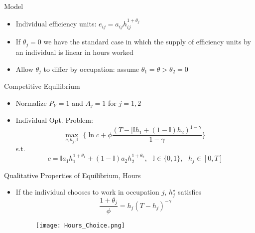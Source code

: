\documentclass[hyperref={bookmarks=false}]{beamer}
\begin{document}
\begin{frame}{Model}
\begin{itemize}
\setlength{\itemsep}{0.35 cm}
\item Individual efficiency units: $e_{ij}=a_{ij}h_{ij}^{1+\theta_{j}}$
\item If $\theta_j=0$ we have the standard case in which the supply of efficiency units by an individual is linear in hours worked
\item Allow $\theta_j$ to differ by occupation: assume $\theta_1=\theta>\theta_2=0$
\end{itemize}
\end{frame}

\begin{frame}{Competitive Equilibrium}
\begin{itemize}
\setlength{\itemsep}{0.35 cm}
\item Normalize $P_Y=1$ and $A_j=1$ for $j=1,2$
\item Individual Opt. Problem:
\begin{equation}
\underset{c,h_j,\mathbb{I}}{\text{max}}\,\,\,\, \Big\{\ln c + \phi \frac{(T-[\mathbb{I}h_1+(1-\mathbb{I})h_2)^{1-\gamma}}{1-\gamma} \Big\}
\end{equation}
s.t.
\begin{equation}
c=\mathbb{I}a_{1}h_{1}^{1+\theta_{1}}+(1-\mathbb{I})a_{2}h_{2}^{1+\theta_2},\,\,\,\, \mathbb{I}\in\{0,1\}, \,\,\,\, h_j\in[0,T]
\end{equation}
\end{itemize}
\end{frame}

\begin{frame}{Qualitative Properties of Equilibrium, Hours}
\begin{itemize}
\setlength{\itemsep}{0.35 cm}
\item If the individual chooses to work in occupation $j$, $h_{j}^{\star}$ satisfies
\begin{equation}
\frac{1+\theta_j}{\phi}=h_j(T-h_j)^{-\gamma}%
\end{equation} 
\begin{figure}[!t]
\centering
\begin{minipage}[b]{0.6\textwidth}{}
\centering
\texttt{[image: Hours\_Choice.png]}
\end{minipage}
\end{figure}
\end{itemize}
\end{frame}
\end{document}
